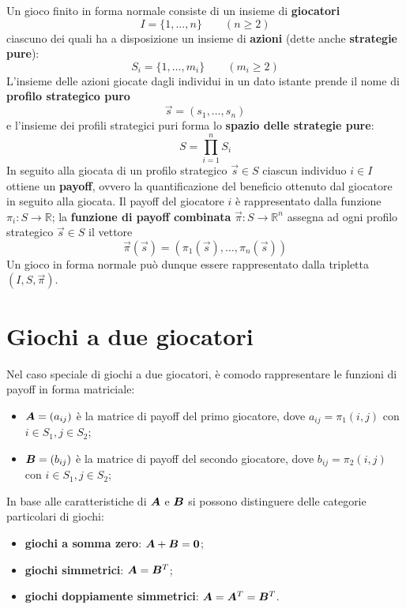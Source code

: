 Un gioco finito in forma normale consiste di un insieme di \textbf{giocatori}
\begin{displaymath}
	I = \{1, \dots, n\} \qquad (n \geq 2)
\end{displaymath}
ciascuno dei quali ha a disposizione un insieme di \textbf{azioni} (dette anche \textbf{strategie pure}):
\begin{displaymath}
	S_i = \{1, \dots, m_i\} \qquad (m_i \geq 2)
\end{displaymath}
L'insieme delle azioni giocate dagli individui in un dato istante prende il nome di \textbf{profilo strategico puro}
\begin{displaymath}
	\vec{s} = (s_1, \dots, s_n)
\end{displaymath}
e l'insieme dei profili strategici puri forma lo \textbf{spazio delle strategie pure}:
\begin{displaymath}
	S = \prod_{i = 1}^n S_i
\end{displaymath}
In seguito alla giocata di un profilo strategico $\vec{s} \in S$ ciascun individuo $i \in I$ ottiene un \textbf{payoff}, ovvero la quantificazione del beneficio ottenuto dal giocatore in seguito alla giocata. Il payoff del giocatore $i$ è rappresentato dalla funzione $\pi_i: S \rightarrow \mathbb{R}$; la \textbf{funzione di payoff combinata} $\vec{\pi}: S \rightarrow \mathbb{R}^n$ assegna ad ogni profilo strategico $\vec{s} \in S$ il vettore
\begin{displaymath}
	\vec{\pi}(\vec{s}) = (\pi_1(\vec{s}), \dots, \pi_n(\vec{s}))
\end{displaymath}
Un gioco in forma normale può dunque essere rappresentato dalla tripletta $(I, S, \vec{\pi})$.

\section{Giochi a due giocatori}

Nel caso speciale di giochi a due giocatori, è comodo rappresentare le funzioni di payoff in forma matriciale:
\begin{itemize}
	\item $\mat{A} = (a_{ij})$ è la matrice di payoff del primo giocatore, dove $a_{ij} = \pi_1(i, j)$ con $i \in S_1, j \in S_2$;
	\item $\mat{B} = (b_{ij})$ è la matrice di payoff del secondo giocatore, dove $b_{ij} = \pi_2(i, j)$ con $i \in S_1, j \in S_2$;
\end{itemize}
In base alle caratteristiche di $\mat{A}$ e $\mat{B}$ si possono distinguere delle categorie particolari di giochi:
\begin{itemize}
	\item \textbf{giochi a somma zero}: $\mat{A} + \mat{B} = \mat{0}$;
	\item \textbf{giochi simmetrici}: $\mat{A} = \mat{B}^T$;
	\item \textbf{giochi doppiamente simmetrici}: $\mat{A} = \mat{A}^T = \mat{B}^T$.
\end{itemize}

